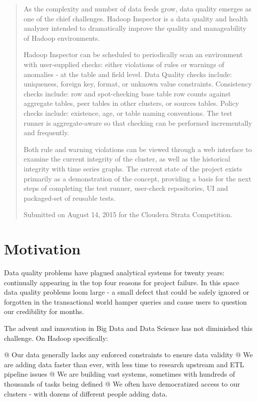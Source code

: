 \begin{abstract}
As the complexity and number of data feeds grow, data quality emerges as one of the chief challenges.  Hadoop Inspector
is a data quality and health analyzer intended to dramatically improve the quality and manageability of Hadoop
environments.

Hadoop Inspector can be scheduled to periodically scan an environment with user-supplied checks:  either violations of
rules or warnings of anomalies - at the table and field level. Data Quality checks include: uniqueness, foreign key,
format, or unknown value constraints.  Consistency checks include: row and spot-checking base table row counts against
aggregate tables, peer tables in other clusters, or sources tables.   Policy checks include: existence, age, or table
naming conventions.   The test runner is aggregate-aware so that checking can be performed incrementally and frequently.

Both rule and warning violations can be viewed through a web interface to examine the current integrity of the cluster,
as well as the historical integrity with time series graphs. The current state of the project exists primarily as a
demonstration of the concept, providing a basis for the next steps of completing the test runner, user-check
repositories, UI and packaged-set of reusable tests.

Submitted on August 14, 2015 for the Cloudera Strata Competition.
\end{abstract}

\section{Motivation}
Data quality problems have plagued analytical systems for twenty years: continually appearing in the top four reasons
for project failure. In this space data quality problems loom large - a small defect that could be safely ignored or
forgotten in the transactional world hamper queries and cause users to question our credibility for months.

The advent and innovation in Big Data and Data Science has not diminished this challenge. On Hadoop specifically:

\begin{easylist}[itemize]
    @ Our data generally lacks any enforced constraints to ensure data validity
    @ We are adding data faster than ever, with less time to research upstream and ETL pipeline issues
    @ We are building vast systems, sometimes with hundreds of thousands of tasks being defined
    @ We often have democratized access to our clusters - with dozens of different people adding data.
\end{easylist}

